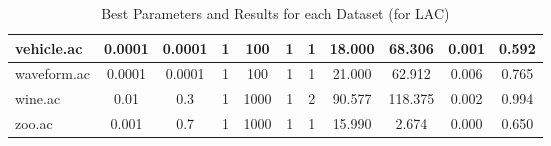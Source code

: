 \begin{table}[htbp]
\begin{tabular}{|l|c|c|c|c|c|c||c|c|c|c|}
		\hline
		vehicle.ac     & 0.0001   & 0.0001      & 1              & 100                 & 1             & 1             & 18.000         & 68.306         & 0.001          & 0.592          \\
		\hline
		waveform.ac    & 0.0001   & 0.0001      & 1              & 100                 & 1             & 1             & 21.000         & 62.912         & 0.006          & 0.765          \\
		\hline
		wine.ac        & 0.01     & 0.3         & 1              & 1000                & 1             & 2             & 90.577         & 118.375        & 0.002          & 0.994          \\
		\hline
		zoo.ac         & 0.001    & 0.7         & 1              & 1000                & 1             & 1             & 15.990         & 2.674          & 0.000          & 0.650          \\
		\hline
		\end{tabular}
	\caption{Best Parameters and Results for each Dataset (for LAC)}
	\label{tab:best_runs_for_each_db_lac}
\end{table}